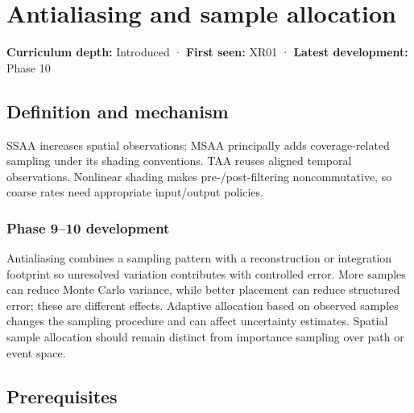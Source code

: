 \hypertarget{appendix-4192b2bdd21e}{}\label{referencestart:appendix-4192b2bdd21e}
\section{Antialiasing and sample allocation}\label{appendix-4192b2bdd21e-antialiasing-and-sample-allocation}

\textbf{Curriculum depth:} Introduced · \textbf{First seen:} XR01 · \textbf{Latest development:} Phase 10

\begin{allmightroledefinition}

\subsection{Definition and mechanism}\label{appendix-4192b2bdd21e-definition-and-mechanism}

SSAA increases spatial observations; MSAA principally adds coverage-related sampling under its shading conventions. TAA reuses aligned temporal observations. Nonlinear shading makes pre-/post-filtering noncommutative, so coarse rates need appropriate input/output policies.

\end{allmightroledefinition}

\subsubsection{Phase 9--10 development}\label{appendix-4192b2bdd21e-phase-910-development}

Antialiasing combines a sampling pattern with a reconstruction or integration footprint so unresolved variation contributes with controlled error. More samples can reduce Monte Carlo variance, while better placement can reduce structured error; these are different effects. Adaptive allocation based on observed samples changes the sampling procedure and can affect uncertainty estimates. Spatial sample allocation should remain distinct from importance sampling over path or event space.

\subsection{Prerequisites}\label{appendix-4192b2bdd21e-prerequisites}

